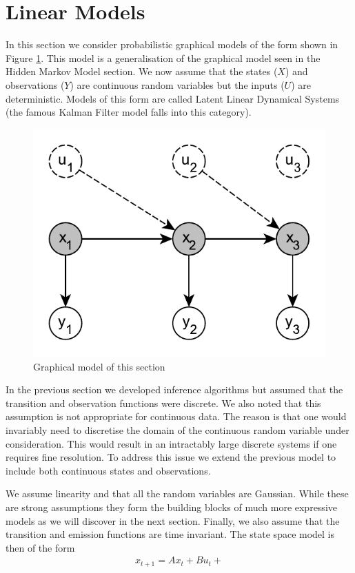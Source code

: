 \documentclass[../masters.tex]{subfiles}
\begin{document}
\graphicspath{{./imgs/}{../imgs/}} %

\section{Linear Models}
In this section we consider probabilistic graphical models of the form shown in Figure \ref{fig_linmod}. This model is a generalisation of the graphical model seen in the Hidden Markov Model section. We now assume that the states ($X$) and observations ($Y$) are continuous random variables but the inputs ($U$) are deterministic. Models of this form are called Latent Linear Dynamical Systems (the famous Kalman Filter model falls into this category).
\begin{figure}[H] 
\centering
\includegraphics[scale=1.0]{linear_model.pdf}
\caption{Graphical model of this section}
\label{fig_linmod}
\end{figure}
In the previous section we developed inference algorithms but assumed that the transition and observation functions were discrete. We also noted that this assumption is not appropriate for continuous data. The reason is that one would invariably need to discretise the domain of the continuous random variable under consideration. This would result in an intractably large discrete systems if one requires fine resolution. To address this issue we extend the previous model to include both continuous states and observations. 

We assume linearity and that all the random variables are Gaussian. While these are strong assumptions they form the building blocks of much more expressive models as we will discover in the next section. Finally, we also assume that the transition and emission functions are time invariant. The state space model is then of the form
\begin{equation}
\begin{aligned}
x_{t+1} = Ax_t + Bu_t + 
\end{aligned}
\end{equation}




\end{document}
